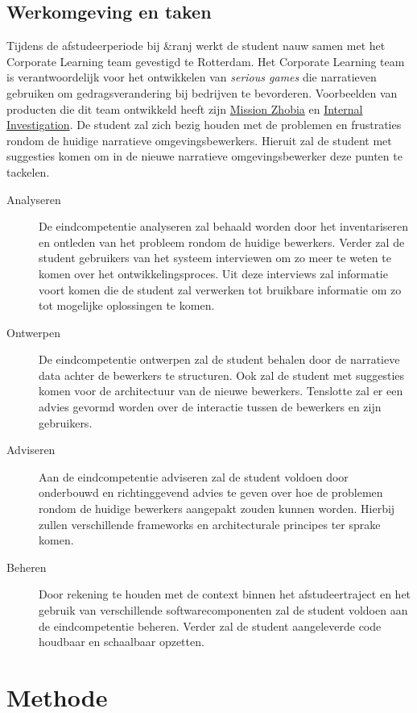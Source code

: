 \documentclass{report}
\newcommand{\organisation}{\&ranj }
\begin{document}
\section{Werkomgeving en taken}
Tijdens de afstudeerperiode bij \organisation werkt de student nauw samen met het Corporate Learning team gevestigd te Rotterdam. Het Corporate Learning team is verantwoordelijk voor het ontwikkelen van \emph{serious games} die narratieven gebruiken om gedragsverandering bij bedrijven te bevorderen. Voorbeelden van producten die dit team ontwikkeld heeft zijn \href{https://ranj.com/projects/corporate/development#mission-zhobia}{Mission Zhobia} en \href{https://ranj.nl/projects/corporate/development#internal-investigation-game}{Internal Investigation}. De student zal zich bezig houden met de problemen en frustraties rondom de huidige narratieve omgevingsbewerkers. Hieruit zal de student met suggesties komen om in de nieuwe narratieve omgevingsbewerker deze punten te tackelen.
\begin{description}
\item[Analyseren] De eindcompetentie analyseren zal behaald worden door het inventariseren en ontleden van het probleem rondom de huidige bewerkers. Verder zal de student gebruikers van het systeem interviewen om zo meer te weten te komen over het ontwikkelingsproces. Uit deze interviews zal informatie voort komen die de student zal verwerken tot bruikbare informatie om zo tot mogelijke oplossingen te komen.
\item[Ontwerpen] De eindcompetentie ontwerpen zal de student behalen door de narratieve data achter de bewerkers te structuren. Ook zal de student met suggesties komen voor de architectuur van de nieuwe bewerkers. Tenslotte zal er een advies gevormd worden over de interactie tussen de bewerkers en zijn gebruikers.
\item[Adviseren] Aan de eindcompetentie adviseren zal de student voldoen door onderbouwd en richtinggevend advies te geven over hoe de problemen rondom de huidige bewerkers aangepakt zouden kunnen worden. Hierbij zullen verschillende frameworks en architecturale principes ter sprake komen.
\item[Beheren] Door rekening te houden met de context binnen het afstudeertraject en het gebruik van verschillende softwarecomponenten zal de student voldoen aan de eindcompetentie beheren. Verder zal de student aangeleverde code houdbaar en schaalbaar opzetten.
\end{description}


\chapter{Methode}
\end{document}
